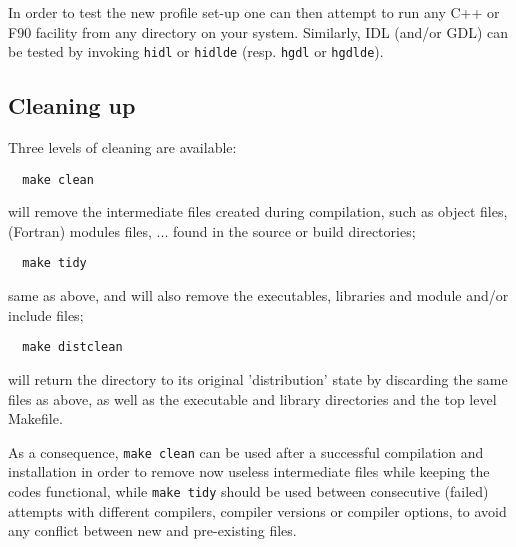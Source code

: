 \documentclass[12pt,twoside]{article}
\begin{document}
\begin{itemize}
\end{itemize}

In order to test the new \healpix profile set-up one can then attempt
to run any C++ or F90 facility from any directory on your system. Similarly,
IDL (and/or GDL) can be tested by invoking {\tt hidl} or {\tt hidlde}  (resp. {\tt hgdl} or {\tt hgdlde}).



\subsection{Cleaning up}
Three levels of cleaning are available:
\begin{verbatim}
  make clean
\end{verbatim}
will remove the intermediate files created during compilation, such as object
files, (Fortran) modules files, ... found in the source or build directories;
\begin{verbatim}
  make tidy
\end{verbatim}
same as above, and will also remove the \healpix executables, libraries and module and/or
include files;
\begin{verbatim}
  make distclean
\end{verbatim}
will return the \healpix directory to its original 'distribution' state by discarding the same
files as above, as well as the executable and library directories and the top
level Makefile.

As a consequence, {\tt make clean} can be used after a successful compilation and installation in order to remove now useless intermediate files while keeping the codes functional, 
while
{\tt make tidy} should be used between consecutive (failed) attempts with different compilers, compiler versions or compiler options, to avoid any conflict between new and pre-existing files.


\end{document}

